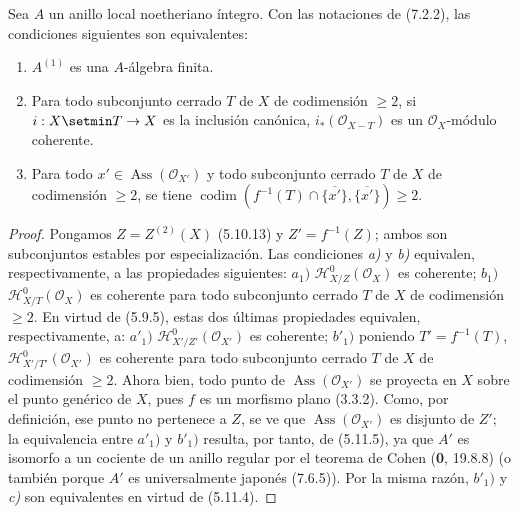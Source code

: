 \begin{proposition}[7.2.3]
\label{IV.2.s7.2.3-fr}
Sea $A$ un anillo local noetheriano íntegro. Con las notaciones de
\textup{(7.2.2)}, las condiciones siguientes son equivalentes:
\begin{enumerate}
\item[\textup{a)}] $A^{(1)}$ es una $A$-álgebra finita.
\item[\textup{b)}] Para todo subconjunto cerrado $T$ de $X$ de codimensión
$\geqslant2$, si $i:X\setmin T\to X$ es la inclusión canónica,
$i_*(\mathscr O_{X-T})$ es un $\mathscr O_X$-módulo coherente.
\item[\textup{c)}] Para todo $x'\in\operatorname{Ass}(\mathscr O_{X'})$ y todo
subconjunto cerrado $T$ de $X$ de codimensión $\geqslant2$, se tiene
$\operatorname{codim}(f^{-1}(T)\cap\overline{\{x'\}},
\overline{\{x'\}})\geqslant2$.
\end{enumerate}
\end{proposition}

\begin{proof}
Pongamos $Z=Z^{(2)}(X)$ (5.10.13) y $Z'=f^{-1}(Z)$; ambos son
subconjuntos estables por especialización. Las condiciones \emph{a)} y \emph{b)}
equivalen, respectivamente, a las propiedades siguientes:
$a_1)$ $\mathscr H^0_{X/Z}(\mathscr O_X)$ es coherente;
$b_1)$ $\mathscr H^0_{X/T}(\mathscr O_X)$ es coherente para todo
subconjunto cerrado $T$ de $X$ de codimensión $\geqslant2$.
En virtud de (5.9.5), estas dos últimas propiedades equivalen,
respectivamente, a:
$a'_1)$ $\mathscr H^0_{X'/Z'}(\mathscr O_{X'})$ es coherente;
$b'_1)$ poniendo $T'=f^{-1}(T)$,
$\mathscr H^0_{X'/T'}(\mathscr O_{X'})$ es coherente para todo
subconjunto cerrado $T$ de $X$ de codimensión $\geqslant2$.
Ahora bien, todo punto de $\operatorname{Ass}(\mathscr O_{X'})$ se
proyecta en $X$ sobre el punto genérico de $X$, pues $f$ es un
morfismo plano (3.3.2). Como, por definición, ese punto no pertenece
a $Z$, se ve que $\operatorname{Ass}(\mathscr O_{X'})$ es disjunto de
$Z'$; la equivalencia entre $a'_1)$ y $b'_1)$ resulta, por tanto,
de (5.11.5), ya que $A'$ es isomorfo a un cociente de un anillo regular
por el teorema de Cohen (\textbf 0, 19.8.8) (o también
porque $A'$ es universalmente japonés (7.6.5)). Por la misma razón,
$b'_1)$ y \emph{c)} son equivalentes en virtud de (5.11.4).
\end{proof}
